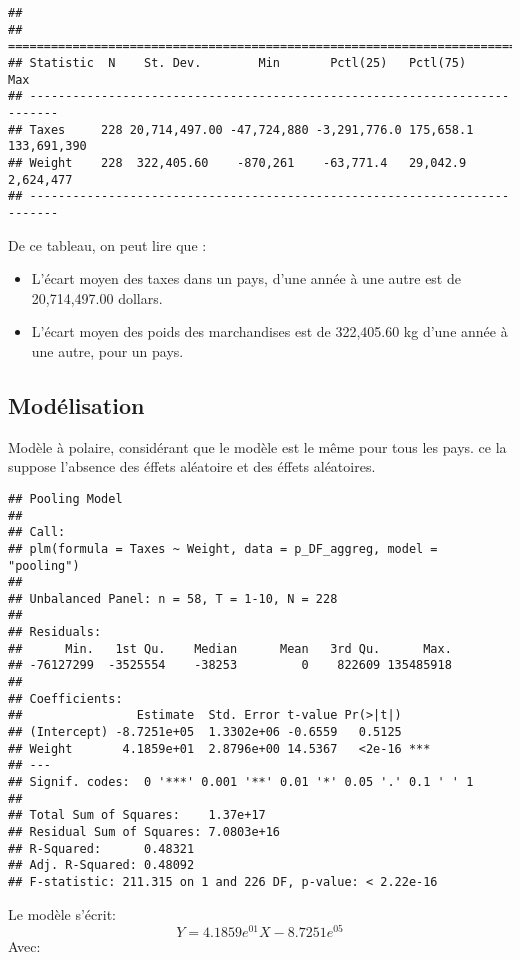 \documentclass[
]{book}
\providecommand{\tightlist}{%
  \setlength{\itemsep}{0pt}\setlength{\parskip}{0pt}}
\begin{document}
\begin{verbatim}
## 
## ==========================================================================
## Statistic  N    St. Dev.        Min       Pctl(25)   Pctl(75)      Max    
## --------------------------------------------------------------------------
## Taxes     228 20,714,497.00 -47,724,880 -3,291,776.0 175,658.1 133,691,390
## Weight    228  322,405.60    -870,261    -63,771.4   29,042.9   2,624,477 
## --------------------------------------------------------------------------
\end{verbatim}

De ce tableau, on peut lire que :

\begin{itemize}
\tightlist
\item
  L'écart moyen des taxes dans un pays, d'une année à une autre est de 20,714,497.00 dollars.
\item
  L'écart moyen des poids des marchandises est de 322,405.60 kg d'une année à une autre, pour un pays.
\end{itemize}

\hypertarget{moduxe9lisation}{%
\subsection{Modélisation}\label{moduxe9lisation}}

Modèle à polaire, considérant que le modèle est le même pour tous les pays. ce la suppose l'absence des éffets aléatoire et des éffets aléatoires.

\begin{verbatim}
## Pooling Model
## 
## Call:
## plm(formula = Taxes ~ Weight, data = p_DF_aggreg, model = "pooling")
## 
## Unbalanced Panel: n = 58, T = 1-10, N = 228
## 
## Residuals:
##      Min.   1st Qu.    Median      Mean   3rd Qu.      Max. 
## -76127299  -3525554    -38253         0    822609 135485918 
## 
## Coefficients:
##                Estimate  Std. Error t-value Pr(>|t|)    
## (Intercept) -8.7251e+05  1.3302e+06 -0.6559   0.5125    
## Weight       4.1859e+01  2.8796e+00 14.5367   <2e-16 ***
## ---
## Signif. codes:  0 '***' 0.001 '**' 0.01 '*' 0.05 '.' 0.1 ' ' 1
## 
## Total Sum of Squares:    1.37e+17
## Residual Sum of Squares: 7.0803e+16
## R-Squared:      0.48321
## Adj. R-Squared: 0.48092
## F-statistic: 211.315 on 1 and 226 DF, p-value: < 2.22e-16
\end{verbatim}

Le modèle s'écrit:
\[Y= 4.1859e^{01} X - 8.7251e^{05}  \]
Avec:
\end{document}
